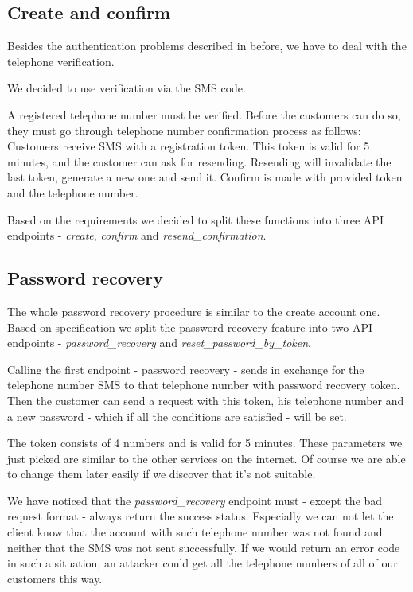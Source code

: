 \subsection{Create and confirm}
Besides the authentication problems described in before, we have to deal with the telephone verification.

We decided to use verification via the SMS code.

A registered telephone number must be verified.  Before the customers can do so, they must go through telephone number confirmation process as follows: Customers receive SMS with a registration token. This token is valid for 5 minutes, and the customer can ask for resending.  Resending will invalidate the last token, generate a new one and send it. Confirm is made with provided token and the telephone number.

Based on the requirements we decided to split these functions into three API endpoints - \textit{create}, \textit{confirm} and \textit{resend\_confirmation}.
 
 \subsection{Password recovery}
 The whole password recovery procedure is similar to the create account one.
 Based on specification we split the password recovery feature into two API endpoints - \textit{password\_recovery} and \textit{reset\_password\_by\_token}. 
 
 Calling the first endpoint - password recovery - sends in exchange for the telephone number SMS to that telephone number with password recovery token. Then the customer can send a request with this token, his telephone number and a new password - which if all the conditions are satisfied - will be set. 
 
 The token consists of 4 numbers and is valid for 5 minutes. These parameters we just picked are similar to the other services on the internet. Of course we are able to change them later easily if we discover that it's not suitable.
 
 We have noticed that the \textit{password\_recovery} endpoint must - except the bad request format - always return the success status. Especially we can not let the client know that the account with such telephone number was not found and neither that the SMS was not sent successfully. If we would return an error code in such a situation, an attacker could get all the telephone numbers of all of our customers this way.
 
